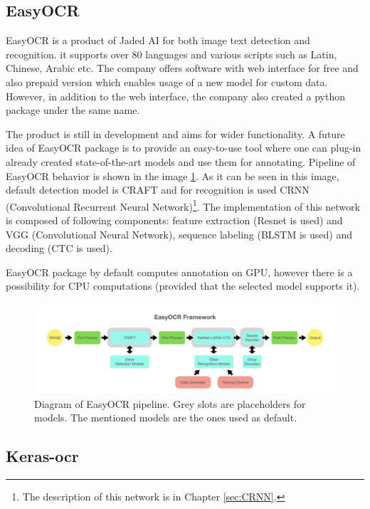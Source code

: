 \subsection{EasyOCR}

EasyOCR is a product of Jaded AI for both image text detection and recognition. it supports over 80 languages and various scripts such as Latin, Chinese, Arabic etc. The company offers software with web interface for free and also prepaid version which enables usage of a new model for custom data. However, in addition to the web interface, the company also created a python package under the same name.\cite{easyocr1}

The product is still in development and aims for wider functionality. A future idea of EasyOCR package is to provide an easy-to-use tool where one can plug-in already created state-of-the-art models and use them for annotating. Pipeline of EasyOCR behavior is shown in the image \ref*{img:easyocrPipeline}. As it can be seen in this image, default detection model is CRAFT and for recognition is used CRNN (Convolutional Recurrent Neural Network)\footnote{The description of this network is in Chapter \ref*{sec:CRNN}.}. The implementation of this network is composed of following components: feature extraction (Resnet is used) and VGG (Convolutional Neural Network), sequence labeling (BLSTM is used) and decoding (CTC is used).\cite{easyocr2}

EasyOCR package by default computes annotation on GPU, however there is a possibility for CPU computations (provided that the selected model supports it). 

\begin{figure}[hbtp]
    \centering
    \includegraphics[scale=0.4]{obrazky/easyocr_framework.jpeg}
    \caption{Diagram of EasyOCR pipeline. Grey slots are placeholders for models. The mentioned models are the ones used as default. \cite{easyocr2}}
    \label{img:easyocrPipeline}
\end{figure}

\subsection{Keras-ocr}

